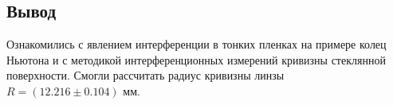 \documentclass[a4paper, 12pt]{article}
\begin{document}
\begin{enumerate}
			\section{Вывод}
			Ознакомились с явлением интерференции в тонких пленках на примере колец Ньютона и с методикой интерференционных измерений кривизны стеклянной поверхности. Смогли рассчитать радиус кривизны линзы $R=(12.216\pm0.104)\text{ мм}.$
	\end{enumerate}
\end{document}
